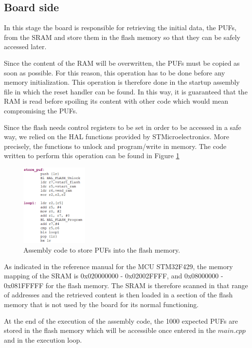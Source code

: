 \subsection{Board side}

In this stage the board is responsible for retrieving the initial data, the PUFs, from the SRAM and store them in the flash memory so that they can be safely accessed later.

Since the content of the RAM will be overwritten, the PUFs must be copied as soon as possible. For this reason, this operation has to be done before any memory initialization. This operation is therefore done in the startup assembly file in which the reset handler can be found. In this way, it is guaranteed that the RAM is read before spoiling its content with other code which would mean compromising the PUFs.

Since the flash needs control registers to be set in order to be accessed in a safe way, we relied on the HAL functions provided by STMicroelectronics. More precisely, the functions to unlock and program/write in memory. The code written to perform this operation can be found in Figure \ref{fig:code_assembly}

\begin{figure}[h!]
	\centering
	\vspace{0.5cm}
	\includegraphics[width = 0.3\textwidth]{images/code_assembly.png}
	\caption{Assembly code to store PUFs into the flash memory. }
	\label{fig:code_assembly}
\end{figure}

As indicated in the reference manual for the MCU STM32F429\cite{STM32F429}, the memory mapping of the SRAM is 0x020000000 -  0x02002FFFF, and 0x08000000 - 0x081FFFFF for the flash memory. The SRAM is therefore scanned in that range of addresses and the retrieved content is then loaded in a section of the flash memory that is not used by the board for its normal functioning.

At the end of the execution of the assembly code, the 1000 expected PUFs are stored in the flash memory which will be accessible once entered in the $main.cpp$ and in the execution loop. 

